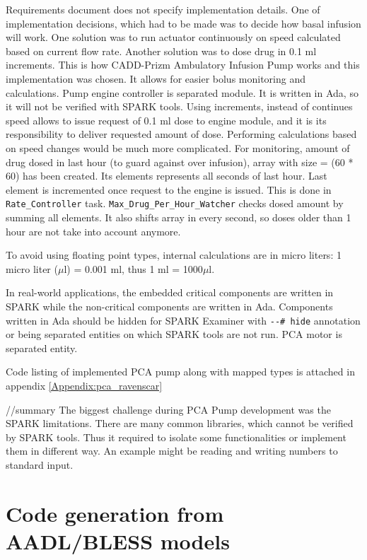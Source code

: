 Requirements document does not specify implementation details. One of implementation decisions, which had to be made was to decide how basal infusion will work. One solution was to run actuator continuously on speed calculated based on current flow rate. Another solution was to dose drug in 0.1 ml increments. This is how CADD-Prizm Ambulatory Infusion Pump \cite{CADD-PrizmAmbulatoryInfusionPump:Online} works and this implementation was chosen. It allows for easier bolus monitoring and calculations. Pump engine controller is separated module. It is written in Ada, so it will not be verified with SPARK tools. Using increments, instead of continues speed allows to issue request of 0.1 ml dose to engine module, and it is its responsibility to deliver requested amount of dose. Performing calculations based on speed changes would be much more complicated. For monitoring, amount of drug dosed in last hour (to guard against over infusion), array with size = (60 * 60) has been created. Its elements represents all seconds of last hour. Last element is incremented once request to the engine is issued. This is done in \lstinline{Rate_Controller} task. \lstinline{Max_Drug_Per_Hour_Watcher} checks dosed amount by summing all elements. It also shifts array in every second, so doses older than 1 hour are not take into account anymore.

To avoid using floating point types, internal calculations are in micro liters: 1 micro liter ($\mu$l) = 0.001 ml, thus 1 ml = 1000$\mu$l.

In real-world applications, the embedded critical components are written in SPARK while the non-critical components are written in Ada. Components written in Ada should be hidden for SPARK Examiner with \lstinline{--# hide} annotation or being separated entities on which SPARK tools are not run. PCA motor is separated entity.

Code listing of implemented PCA pump along with mapped types is attached in appendix \ref{Appendix:pca_ravenscar}

//summary
The biggest challenge during PCA Pump development was the SPARK limitations. There are many common libraries, which cannot be verified by SPARK tools. Thus it required to isolate some functionalities or implement them in different way. An example might be reading and writing numbers to standard input.



\section{Code generation from AADL/BLESS models}
\label{pcapumpimpl:codegen}

